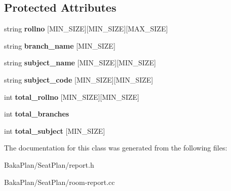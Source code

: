 \subsection*{Protected Attributes}
\begin{DoxyCompactItemize}
\item 
\hypertarget{classRoomReport_af342c8a98e579b420ebde3783ad5f3df}{string {\bfseries rollno} \mbox{[}M\-I\-N\-\_\-\-S\-I\-Z\-E\mbox{]}\mbox{[}M\-I\-N\-\_\-\-S\-I\-Z\-E\mbox{]}\mbox{[}M\-A\-X\-\_\-\-S\-I\-Z\-E\mbox{]}}\label{classRoomReport_af342c8a98e579b420ebde3783ad5f3df}

\item 
\hypertarget{classRoomReport_a2582b819b47038641678e4645f25de34}{string {\bfseries branch\-\_\-name} \mbox{[}M\-I\-N\-\_\-\-S\-I\-Z\-E\mbox{]}}\label{classRoomReport_a2582b819b47038641678e4645f25de34}

\item 
\hypertarget{classRoomReport_a530a885bacdce429ae607b741216d4b5}{string {\bfseries subject\-\_\-name} \mbox{[}M\-I\-N\-\_\-\-S\-I\-Z\-E\mbox{]}\mbox{[}M\-I\-N\-\_\-\-S\-I\-Z\-E\mbox{]}}\label{classRoomReport_a530a885bacdce429ae607b741216d4b5}

\item 
\hypertarget{classRoomReport_a62207caf3dd352107bd2566138a98ae4}{string {\bfseries subject\-\_\-code} \mbox{[}M\-I\-N\-\_\-\-S\-I\-Z\-E\mbox{]}\mbox{[}M\-I\-N\-\_\-\-S\-I\-Z\-E\mbox{]}}\label{classRoomReport_a62207caf3dd352107bd2566138a98ae4}

\item 
\hypertarget{classRoomReport_a099a235828672ee6c31dd163d51e648c}{int {\bfseries total\-\_\-rollno} \mbox{[}M\-I\-N\-\_\-\-S\-I\-Z\-E\mbox{]}\mbox{[}M\-I\-N\-\_\-\-S\-I\-Z\-E\mbox{]}}\label{classRoomReport_a099a235828672ee6c31dd163d51e648c}

\item 
\hypertarget{classRoomReport_a4ce1c0593c6d5053575fcf7975ed1577}{int {\bfseries total\-\_\-branches}}\label{classRoomReport_a4ce1c0593c6d5053575fcf7975ed1577}

\item 
\hypertarget{classRoomReport_ad526976fbeecd9b4ad1888e1b90eb9ee}{int {\bfseries total\-\_\-subject} \mbox{[}M\-I\-N\-\_\-\-S\-I\-Z\-E\mbox{]}}\label{classRoomReport_ad526976fbeecd9b4ad1888e1b90eb9ee}

\end{DoxyCompactItemize}


The documentation for this class was generated from the following files\-:\begin{DoxyCompactItemize}
\item 
Baka\-Plan/\-Seat\-Plan/report.\-h\item 
Baka\-Plan/\-Seat\-Plan/room-\/report.\-cc\end{DoxyCompactItemize}
